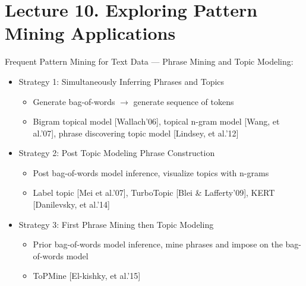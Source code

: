 \section{Lecture 10. Exploring Pattern Mining Applications}

Frequent Pattern Mining for Text Data \-— Phrase Mining and Topic Modeling:
\begin{itemize}
\item Strategy 1: Simultaneously Inferring Phrases and Topics
    \begin{itemize}
    \item Generate bag-of-words $\to$ generate sequence of tokens
    \item Bigram topical model [Wallach’06], topical n-gram model [Wang, et al.’07], phrase discovering topic model [Lindsey, et al.’12]
    \end{itemize}
\item Strategy 2: Post Topic Modeling Phrase Construction
    \begin{itemize}
    \item Post bag-of-words model inference, visualize topics with n-grams
    \item Label topic [Mei et al.’07], TurboTopic [Blei \& Lafferty’09], KERT [Danilevsky, et al.’14]
    \end{itemize}
\item Strategy 3: First Phrase Mining then Topic Modeling
    \begin{itemize}
    \item Prior bag-of-words model inference, mine phrases and impose on the bag-of-words model
    \item ToPMine [El-kishky, et al.’15]
    \end{itemize}
\end{itemize}

